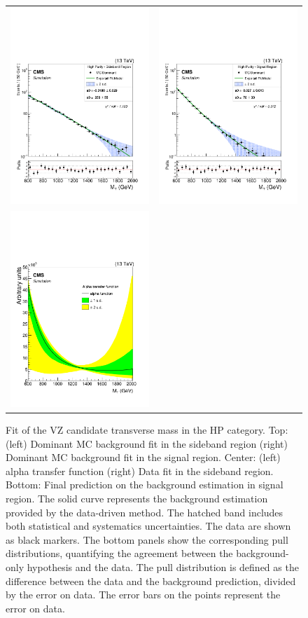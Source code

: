 \begin{figure}[!ht]
\caption{ Fit of the VZ candidate transverse mass in the HP category. Top: (left) Dominant MC background fit in the sideband region (right) Dominant MC background fit in the signal region. Center: (left) alpha transfer function (right) Data fit in the sideband region. Bottom: Final prediction on the background estimation in signal region.
The solid curve represents the background estimation provided by the data-driven
method. The hatched band includes both statistical and systematics uncertainties. The data
are shown as black markers. The bottom panels show the corresponding pull distributions,
quantifying the agreement between the background-only hypothesis and the data. The pull
distribution is defined as the difference between the data and the background prediction, divided by the error on data. The error bars on the points represent the error on data.
}
\begin{tabular}{cc}
\includegraphics[width=150pt]{figuresARC/fits/sbDom_MVZHP.pdf} &
\includegraphics[width=150pt]{figuresARC/fits/sigDom_MVZHP.pdf}\\
\includegraphics[width=150pt]{figuresARC/fits/alphaHP.pdf}&

\end{tabular}
\end{figure}
